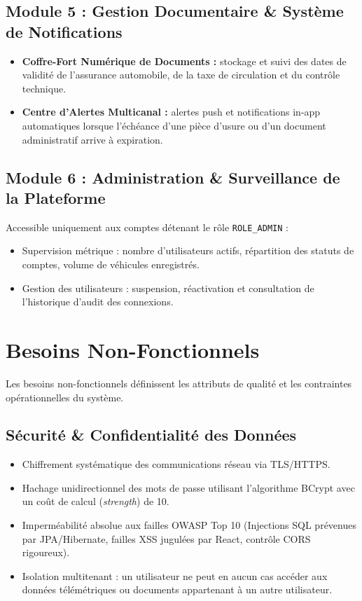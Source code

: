 \documentclass[12pt,a4paper,twoside,openright]{report}
\newcommand{\itembullet}{\textcolor{secondaryBlue}{$\blacktriangleright$}}
\begin{document}
  \subsection{Module 5 : Gestion Documentaire \& Syst\`eme de Notifications}
  \begin{itemize}[label=\itembullet]
    \item \textbf{Coffre-Fort Num\'erique de Documents :} stockage et suivi des dates de validit\'e de l'assurance automobile, de la taxe de circulation et du contr\^ole technique.
    \item \textbf{Centre d'Alertes Multicanal :} alertes push et notifications in-app automatiques lorsque l'\'ech\'eance d'une pi\`ece d'usure ou d'un document administratif arrive \`a expiration.
  \end{itemize}

  \subsection{Module 6 : Administration \& Surveillance de la Plateforme}
  Accessible uniquement aux comptes d\'etenant le r\^ole \texttt{ROLE\_ADMIN} :
  \begin{itemize}[label=\itembullet]
    \item Supervision m\'etrique : nombre d'utilisateurs actifs, r\'epartition des statuts de comptes, volume de v\'ehicules enregistr\'es.
    \item Gestion des utilisateurs : suspension, r\'eactivation et consultation de l'historique d'audit des connexions.
  \end{itemize}

  \section{Besoins Non-Fonctionnels}
  Les besoins non-fonctionnels d\'efinissent les attributs de qualit\'e et les contraintes op\'erationnelles du syst\`eme.

  \subsection{S\'ecurit\'e \& Confidentialit\'e des Donn\'ees}
  \begin{itemize}[label=\itembullet]
    \item Chiffrement syst\'ematique des communications r\'eseau via TLS/HTTPS.
    \item Hachage unidirectionnel des mots de passe utilisant l'algorithme BCrypt avec un co\^ut de calcul (\textit{strength}) de 10.
    \item Imperm\'eabilit\'e absolue aux failles OWASP Top 10 (Injections SQL pr\'evenues par JPA/Hibernate, failles XSS jugul\'ees par React, contr\^ole CORS rigoureux).
    \item Isolation multitenant : un utilisateur ne peut en aucun cas acc\'eder aux donn\'ees t\'el\'em\'etriques ou documents appartenant \`a un autre utilisateur.
  \end{itemize}
\end{document}

